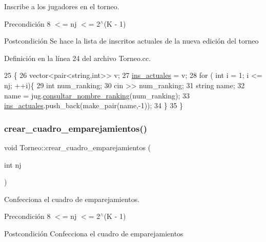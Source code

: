 Inscribe a los jugadores en el torneo. 

\begin{DoxyPrecond}{Precondición}
8 $<$= nj $<$= 2$^\wedge$(K -\/ 1) 
\end{DoxyPrecond}
\begin{DoxyPostcond}{Postcondición}
Se hace la lista de inscritos actuales de la nueva edición del torneo 
\end{DoxyPostcond}


Definición en la línea 24 del archivo Torneo.\+cc.


\begin{DoxyCode}
25 \{
26   vector<pair<string,int>> v;
27   \hyperlink{class_torneo_a2293acd2d9d04bdefc603ab4cdce2c5a}{ins\_actuales} = v;
28   \textcolor{keywordflow}{for} ( \textcolor{keywordtype}{int} i = 1; i <= nj; ++i)\{
29     \textcolor{keywordtype}{int} num\_ranking;
30     cin >> num\_ranking;
31     \textcolor{keywordtype}{string} name;
32     name = jug.\hyperlink{class_cjt__jugadores_ad8d836a5be49a639ffed71a643080d53}{consultar\_nombre\_ranking}(num\_ranking);
33     \hyperlink{class_torneo_a2293acd2d9d04bdefc603ab4cdce2c5a}{ins\_actuales}.push\_back(make\_pair(name,-1));
34   \}
35 \}
\end{DoxyCode}
\mbox{\label{class_torneo_afbbadc7c5829d021921caf2ae9a2d2ee}} 
\subsubsection{\texorpdfstring{crear\+\_\+cuadro\+\_\+emparejamientos()}{crear\_cuadro\_emparejamientos()}}
{\footnotesize\ttfamily void Torneo\+::crear\+\_\+cuadro\+\_\+emparejamientos (\begin{DoxyParamCaption}\item[{int}]{nj }\end{DoxyParamCaption})}



Confecciona el cuadro de emparejamientos. 

\begin{DoxyPrecond}{Precondición}
8 $<$= nj $<$= 2$^\wedge$(K -\/ 1) 
\end{DoxyPrecond}
\begin{DoxyPostcond}{Postcondición}
Confecciona el cuadro de emparejamientos 
\end{DoxyPostcond}


